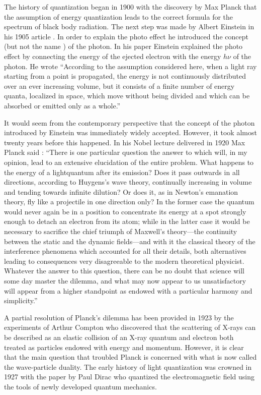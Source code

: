 \documentclass[onecolumn,aps,pra,12pt]{revtex4-1}
\begin{document}
The history of quantization began in 1900 with the discovery by Max Planck \cite{planck,nau} that the assumption of energy quantization leads to the correct formula for the spectrum of black body radiation. The next step was made by Albert Einstein in his 1905 article \cite{ae1}. In order to explain the photo effect he introduced the concept (but not the name \cite{gnl}) of the photon. In his paper Einstein explained the photo effect by connecting the energy of the ejected electron with the energy $h\nu$ of the photon. He wrote ``According to the assumption considered here, when a light ray starting from a point is propagated, the energy is not continuously distributed over an ever increasing volume, but it consists of a finite number of energy quanta, localized in space, which move without being divided and which can be absorbed or emitted only as a whole.''

It would seem from the contemporary perspective that the concept of the photon introduced by Einstein was immediately widely accepted. However, it took almost twenty years before this happened. In his Nobel lecture delivered in 1920 Max Planck said \cite{np}:
``There is one particular question the answer to which will, in my opinion, lead to an extensive elucidation of the entire problem. What happens to the energy of a lightquantum after its emission? Does it pass outwards in all directions, according to Huygens’s wave theory, continually increasing in volume and tending towards infinite dilution? Or does it, as in Newton’s emanation theory, fly like a projectile in one direction only? In the former case the quantum would never again be in a position to concentrate its energy at a spot strongly enough to detach an electron from its atom; while in the latter case it would be necessary to sacrifice the chief triumph of Maxwell’s theory—the continuity between the static and the dynamic fields—and with it the classical theory of the interference phenomena which accounted for all their details, both alternatives leading to consequences very disagreeable to the modern theoretical physicist. Whatever the answer to this question, there can be no doubt that science will some day master the dilemma, and what may now appear to us unsatisfactory will appear from a higher standpoint as endowed with a particular harmony and simplicity.''

A partial resolution of Planck's dilemma has been provided in 1923 by the experiments of Arthur Compton \cite{ac,ac1} who discovered that the scattering of X-rays can be described as an elastic collision of an X-ray quantum and electron both treated as particles endowed with energy and momentum. However, it is clear that the main question that troubled Planck is concerned with what is now called the wave-particle duality. The early history of light quantization was crowned in 1927 with the paper by Paul Dirac \cite{pamd} who quantized the electromagnetic field using the tools of newly developed quantum mechanics.
\end{document}

